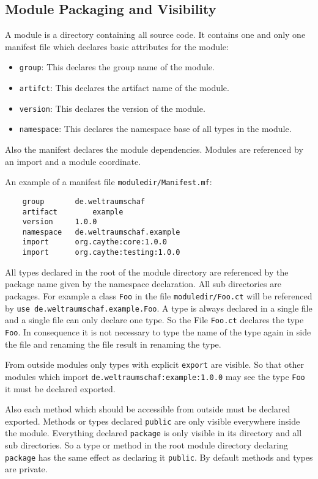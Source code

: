 \documentclass[a4paper,12pt]{article}
\begin{document}
\subsection{Module Packaging and Visibility}

A module is a directory containing all source code. It contains one and only one manifest file which declares basic attributes for the module:

\begin{itemize}
	\item \verb|group|: This declares the group name of the module.
 	\item \verb|artifct|: This declares the artifact name of the module.
 	\item \verb|version|: This declares the version of the module.
 	\item \verb|namespace|: This declares the namespace base of all types in the module.
\end{itemize}

Also the manifest declares the module dependencies. Modules are referenced by an import and a module coordinate.

An example of a manifest file \verb|moduledir/Manifest.mf|:
\begin{verbatim}
	group       de.weltraumschaf
	artifact	    example
	version     1.0.0
	namespace   de.weltraumschaf.example
	import      org.caythe:core:1.0.0
	import      org.caythe:testing:1.0.0
\end{verbatim}

All types declared in the root of the module directory are referenced by the package name given by the namespace declaration. All sub directories are packages. For example a class \verb|Foo| in the file \verb|moduledir/Foo.ct| will be referenced by \verb|use de.weltraumschaf.example.Foo|. A type is always declared in a single file and a single file can only declare one type. So the File \verb|Foo.ct| declares the type \verb|Foo|. In consequence it is not necessary to type the name of the type again in side the file and renaming the file result in renaming the type.

From outside modules only types with explicit \verb|export| are visible. So that other modules which import \verb|de.weltraumschaf:example:1.0.0| may see the type \verb|Foo| it must be declared exported.

Also each method which should be accessible from outside must be declared exported. Methods or types declared \verb|public| are only visible everywhere inside the module. Everything declared \verb|package| is only visible in its directory and all sub directories. So a type or method in the root module directory declaring \verb|package| has the same effect as declaring it \verb|public|. By default methods and types are private.
\end{document}

